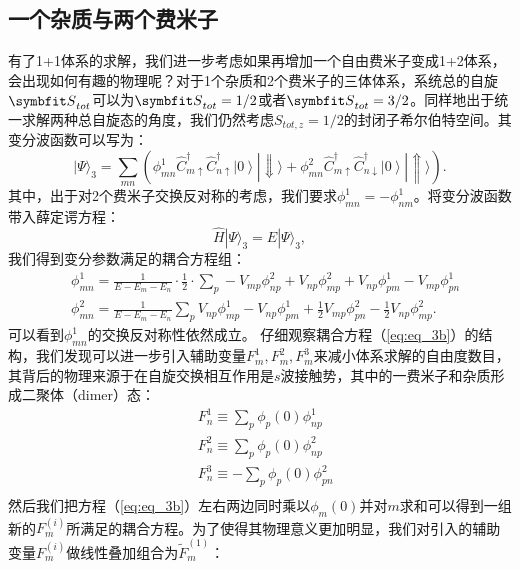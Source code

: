 \subsection{一个杂质与两个费米子}
有了1+1体系的求解，我们进一步考虑如果再增加一个自由费米子变成1+2体系，会出现如何有趣的物理呢？对于1个杂质和2个费米子的三体体系，系统总的自旋${\Vector{S}}_{tot}$可以为${\Vector{S}}_{tot}=1/2$或者${\Vector{S}}_{tot}=3/2$。同样地出于统一求解两种总自旋态的角度，我们仍然考虑$S_{tot,z}=1/2$的封闭子希尔伯特空间。其变分波函数可以写为：
\begin{equation}\label{eq:wv3}
    |\Psi\rangle_3 = \sum_{mn} \left( \phi^1_{mn} \hat{C}_{m\uparrow}^\dagger \hat{C}_{n\uparrow}^\dagger \left|0\right> |\Downarrow\rangle + \phi^2_{mn}  \hat{C}_{m\uparrow}^\dagger \hat{C}_{n\downarrow}^\dagger \left|0\right> |\Uparrow\rangle \right).
\end{equation}
其中，出于对2个费米子交换反对称的考虑，我们要求$\phi^1_{mn} = -\phi^1_{nm}$。将变分波函数带入薛定谔方程：
\begin{equation}
  \hat{H} |\Psi \rangle_3 = E |\Psi\rangle_3,
\end{equation}
我们得到变分参数满足的耦合方程组：
\begin{equation}
    \begin{split}
        &\phi^1_{mn} = \frac{1}{E-E_m-E_n} \cdot \frac{1}{2} \cdot  \sum_{p}-V_{mp}\phi^2_{np}+V_{np}\phi^2_{mp} +V_{np}\phi^1_{pm}- V_{mp}\phi^1_{pn} \\
        &\phi^2_{mn} = \frac{1}{E-E_m-E_n} \sum_p V_{np}\phi^1_{mp}-V_{np}\phi^1_{pm}+ \frac{1}{2} V_{mp}\phi^2_{pn}- \frac{1}{2}V_{np}\phi^2_{mp}.
    \end{split}\label{eq:eq_3b}
\end{equation} 
可以看到$\phi^1_{mn}$的交换反对称性依然成立。
仔细观察耦合方程（\ref{eq:eq_3b}）的结构，我们发现可以进一步引入辅助变量$F^1_m,F^2_m,F^3_m$来减小体系求解的自由度数目，其背后的物理来源于在自旋交换相互作用是$s$波接触势，其中的一费米子和杂质形成二聚体（dimer）态：
    \begin{equation}
        \begin{split}
        &F^1_n \equiv \sum_p\phi_p(0)\phi^1_{np} \\
        &F^2_n \equiv \sum_p\phi_p(0)\phi^2_{np} \\
        &F^3_n \equiv -\sum_p\phi_p(0)\phi^2_{pn}\\
        \end{split} \label{F}
    \end{equation}
然后我们把方程（\ref{eq:eq_3b}）左右两边同时乘以$\phi_m(0)$并对$m$求和可以得到一组新的$F^{(i)}_m$所满足的耦合方程。为了使得其物理意义更加明显，我们对引入的辅助变量$F^{(i)}_m$做线性叠加组合为$\tilde{F}^{(1)}_m$：
